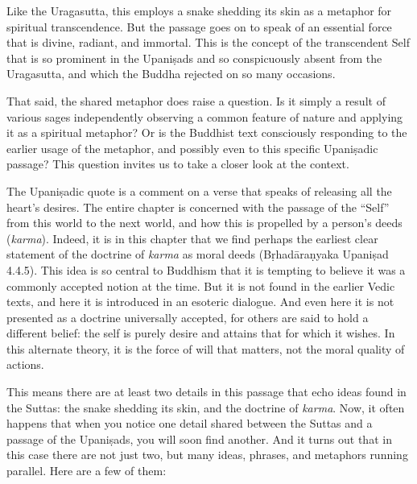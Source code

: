 \documentclass[12pt,openany]{book}%
\begin{document}
Like the Uragasutta, this employs a snake shedding its skin as a metaphor for spiritual transcendence. But the passage goes on to speak of an essential force that is divine, radiant, and immortal. This is the concept of the transcendent Self that is so prominent in the \textsanskrit{Upaniṣads} and so conspicuously absent from the Uragasutta, and which the Buddha rejected on so many occasions.

That said, the shared metaphor does raise a question. Is it simply a result of various sages independently observing a common feature of nature and applying it as a spiritual metaphor? Or is the Buddhist text consciously responding to the earlier usage of the metaphor, and possibly even to this specific \textsanskrit{Upaniṣadic} passage? This question invites us to take a closer look at the context.

The \textsanskrit{Upaniṣadic} quote is a comment on a verse that speaks of releasing all the heart’s desires. The entire chapter is concerned with the passage of the “Self” from this world to the next world, and how this is propelled by a person’s deeds (\textit{karma}). Indeed, it is in this chapter that we find perhaps the earliest clear statement of the doctrine of \textit{karma} as moral deeds (\textsanskrit{Bṛhadāraṇyaka} \textsanskrit{Upaniṣad} 4.4.5). This idea is so central to Buddhism that it is tempting to believe it was a commonly accepted notion at the time. But it is not found in the earlier Vedic texts, and here it is introduced in an esoteric dialogue. And even here it is not presented as a doctrine universally accepted, for others are said to hold a different belief: the self is purely desire and attains that for which it wishes. In this alternate theory, it is the force of will that matters, not the moral quality of actions.

This means there are at least two details in this passage that echo ideas found in the Suttas: the snake shedding its skin, and the doctrine of \textit{karma}. Now, it often happens that when you notice one detail shared between the Suttas and a passage of the \textsanskrit{Upaniṣads}, you will soon find another. And it turns out that in this case there are not just two, but many ideas, phrases, and metaphors running parallel. Here are a few of them:
\end{document}
